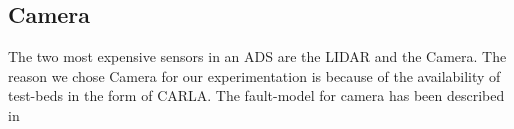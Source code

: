 %

\subsection{Camera}
The two most expensive sensors in an ADS are the LIDAR and the Camera. The reason we chose Camera for our experimentation is because of the availability of test-beds in the form of CARLA. The fault-model for camera has been described in 

